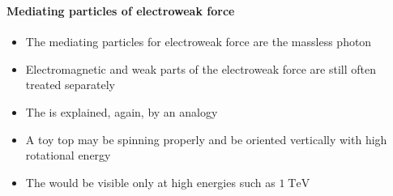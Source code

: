 \begin{frame}
\frametitle{\texorpdfstring{\culine[\sectiontitleulinecolor]{\sectiontitle}}{\sectiontitle} }
\framesubtitle{Mediating particles of electroweak force}

\begin{itemize}
	\item The mediating particles for electroweak force are the massless photon  
	
	\item Electromagnetic and weak parts of the electroweak force are still often treated separately

\item The  is explained, again, by an analogy 
\item A toy top may be spinning properly and be oriented vertically with high rotational energy
\item The  would be visible only at high energies such as $1 \mathrm{\;TeV}$
\end{itemize}

\endofslide 
\end{frame}

